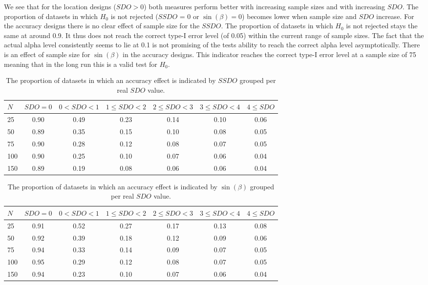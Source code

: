 \documentclass[11pt,]{article}
\begin{document}
We see that for the location designs (\(SDO > 0\)) both measures perform
better with increasing sample sizes and with increasing \(SDO\). The
proportion of datasets in which \textit{$H_0$} is not rejected (\(SSDO\)
= 0 or \(\sin(\beta) = 0\)) becomes lower when sample size and \(SDO\)
increase. For the accuracy designs there is no clear effect of sample
size for the \(SSDO\). The proportion of datasets in which
\textit{$H_0$} is not rejected stays the same at around 0.9. It thus
does not reach the correct type-I error level (of 0.05) within the
current range of sample sizes. The fact that the actual alpha level
consistently seems to lie at 0.1 is not promising of the tests ability
to reach the correct alpha level asymptotically. There is an effect of
sample size for \(\sin(\beta)\) in the accuracy designs. This indicator
reaches the correct type-I error level at a sample size of 75 meaning
that in the long run this is a valid test for \textit{$H_0$}.

\begin{table}
\centering
\caption{The proportion of datasets in which an accuracy effect is indicated by $SSDO$ grouped per real $SDO$ value.} 
\begin{tabular}{lcccccc}
  \noalign{\smallskip}\hline\noalign{\smallskip}
$N$ & $SDO = 0$ & $ 0 < SDO < 1$ & $1 \leq SDO < 2$ & $2 \leq SDO < 3$ &  $3 \leq SDO < 4$ & $4 \leq SDO$\\ \hline\noalign{\smallskip}
25 & 0.90 & 0.49 & 0.23 & 0.14 & 0.10 & 0.06\\
50 & 0.89 & 0.35 & 0.15 & 0.10 & 0.08 & 0.05\\
75 & 0.90 & 0.28 & 0.12 & 0.08 & 0.07 & 0.05\\
100& 0.90 & 0.25 & 0.10 & 0.07 & 0.06 & 0.04\\
150& 0.89 & 0.19 & 0.08 & 0.06 & 0.06 & 0.04\\
   \hline
\end{tabular}
\label{TableResSSDO}
\end{table}

\begin{table}
\centering
\caption{The proportion of datasets in which an accuracy effect is indicated by $\sin(\beta)$ grouped per real $SDO$ value.} 
\begin{tabular}{lcccccc}
  \noalign{\smallskip}\hline\noalign{\smallskip}
$N$ & $SDO = 0$ & $ 0 < SDO < 1$ & $1 \leq SDO < 2$ & $2 \leq SDO < 3$ &  $3 \leq SDO < 4$ & $4 \leq SDO$\\ \hline\noalign{\smallskip}
25 & 0.91 & 0.52 & 0.27 & 0.17 & 0.13 & 0.08\\
50 & 0.92 & 0.39 & 0.18 & 0.12 & 0.09 & 0.06\\
75 & 0.94 & 0.33 & 0.14 & 0.09 & 0.07 & 0.05\\
100& 0.95 & 0.29 & 0.12 & 0.08 & 0.07 & 0.05\\
150& 0.94 & 0.23 & 0.10 & 0.07 & 0.06 & 0.04\\
   \hline
\end{tabular}
\label{TableResdet}
\end{table}
\end{document}
